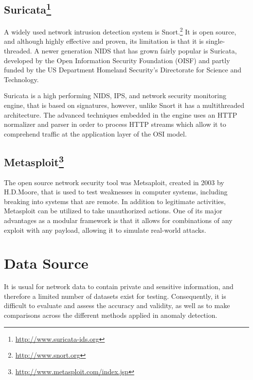 \documentclass[11pt,]{article}
\let\rmarkdownfootnote\footnote%
\def\footnote{\protect\rmarkdownfootnote}
\begin{document}
\subsection[Suricata]{Suricata\footnote{\url{http://www.suricata-ids.org}}}\label{suricata5}

A widely used network intrusion detection system is Snort.\footnote{\url{http://www.snort.org}}
It is open source, and although highly effective and proven, its
limitation is that it is single-threaded. A newer generation NIDS that
has grown fairly popular is Suricata, developed by the Open Information
Security Foundation (OISF) and partly funded by the US Department
Homeland Security's Directorate for Science and Technology.

Suricata is a high performing NIDS, IPS, and network security monitoring
engine, that is based on signatures, however, unlike Snort it has a
multithreaded architecture. The advanced techniques embedded in the
engine uses an HTTP normalizer and parser in order to process HTTP
streams which allow it to comprehend traffic at the application layer of
the OSI model.

\subsection[Metasploit]{Metasploit\footnote{\url{http://www.metasploit.com/index.jsp}}}\label{metasploit7}

The open source network security tool was Metsaploit, created in 2003 by
H.D.Moore, that is used to test weaknesses in computer systems,
including breaking into systems that are remote. In addition to
legitimate activities, Metasploit can be utilized to take unauthorized
actions. One of its major advantages as a modular framework is that it
allows for combinations of any exploit with any payload, allowing it to
simulate real-world attacks.

\newpage

\section{Data Source}\label{data-source}

It is usual for network data to contain private and sensitive
information, and therefore a limited number of datasets exist for
testing. Consequently, it is difficult to evaluate and assess the
accuracy and validity, as well as to make comparisons across the
different methods applied in anomaly detection.
\end{document}
